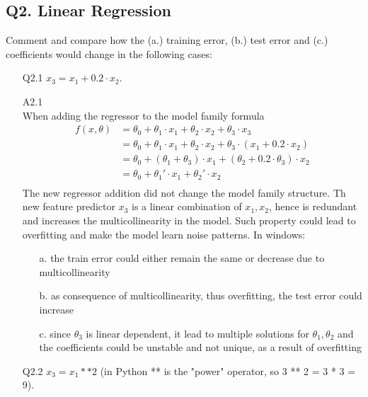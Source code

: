 \documentclass[unicode, 11pt, a4paper]{scrartcl}
\newcommand{\myex}[1]{\begin{equation*}\begin{aligned} #1 \end{aligned}\end{equation*}}
\begin{document}
\subsection*{Q2. Linear Regression}
Comment and compare how the (a.) training error, (b.) test error and (c.) coefficients
would change in the following cases:
\begin{itemize}
	\item[Q2.1] $x_3 = x_1 + 0.2 \cdot x_2$.

	\item[A2.1] ~\\
	      When adding the regressor to the model family formula
	      \myex{
		      f(x, \theta) &= \theta_0 + \theta_1 \cdot x_1 + \theta_2 \cdot x_2 + \theta_3 \cdot x_3\\
		      &= \theta_0 + \theta_1 \cdot x_1 + \theta_2 \cdot x_2 + \theta_3 \cdot (x_1 + 0.2 \cdot x_2)\\
		      &= \theta_0 + (\theta_1 + \theta_3) \cdot x_1 + (\theta_2 + 0.2 \cdot \theta_3) \cdot x_2\\
		      &= \theta_0 + \theta_1' \cdot x_1 + \theta_2' \cdot x_2\\
	      }
	      The new regressor addition did not change the model family structure.
	      Th new feature predictor $x_3$ is a linear combination of $x_1, x_2$,
	      hence is redundant and increases the multicollinearity in the model.
	      Such property could lead to overfitting and make the model learn noise patterns.
	      In windows:
	      \begin{itemize}
		      \item[a.] the train error could either remain the same or decrease due to multicollinearity
		      \item[b.] as consequence of multicollinearity, thus overfitting, the test error could increase
		      \item[c.] since $\theta_3$ is linear dependent, it lead to multiple solutions
		            for $\theta_1, \theta_2$ and the coefficients could be unstable and not unique,
		            as a result of overfitting
	      \end{itemize}

	\item[Q2.2] $x_3 = x_1 ** 2$ (in Python ** is the "power" operator, so  3 ** 2 = 3 * 3 = 9).


\end{itemize}
\end{document}
